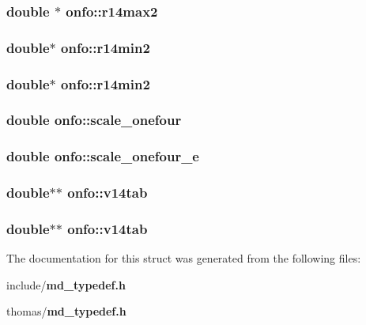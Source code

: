 \subsubsection{\setlength{\rightskip}{0pt plus 5cm}double $\ast$ {\bf onfo::r14max2}}\label{structonfo_018b37fd6bac8e9eafe21dc3c240171c}


\subsubsection{\setlength{\rightskip}{0pt plus 5cm}double$\ast$ {\bf onfo::r14min2}}\label{structonfo_3b91496e8efb01e83657c67ebe4f0c22}


\subsubsection{\setlength{\rightskip}{0pt plus 5cm}double$\ast$ {\bf onfo::r14min2}}\label{structonfo_3b91496e8efb01e83657c67ebe4f0c22}


\subsubsection{\setlength{\rightskip}{0pt plus 5cm}double {\bf onfo::scale\_\-onefour}}\label{structonfo_58ca6d5c8931d05d3cb3d95211597e2b}


\subsubsection{\setlength{\rightskip}{0pt plus 5cm}double {\bf onfo::scale\_\-onefour\_\-e}}\label{structonfo_c357efb5309ed4bbe6c04ca21480fc5a}


\subsubsection{\setlength{\rightskip}{0pt plus 5cm}double$\ast$$\ast$ {\bf onfo::v14tab}}\label{structonfo_888c0bef72fa3214c58645b135bb7046}


\subsubsection{\setlength{\rightskip}{0pt plus 5cm}double$\ast$$\ast$ {\bf onfo::v14tab}}\label{structonfo_888c0bef72fa3214c58645b135bb7046}




The documentation for this struct was generated from the following files:\begin{CompactItemize}
\item 
include/{\bf md\_\-typedef.h}\item 
thomas/{\bf md\_\-typedef.h}\end{CompactItemize}

